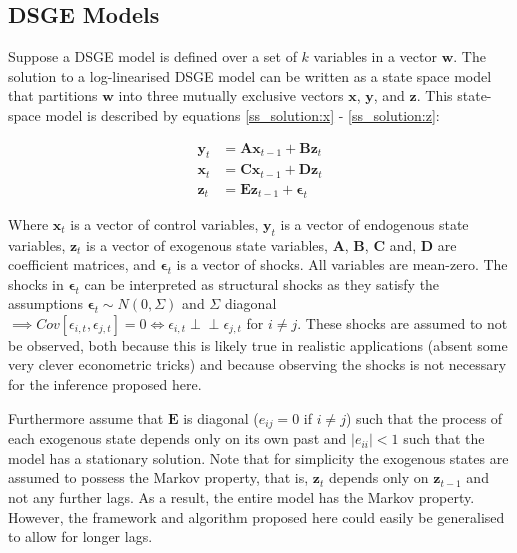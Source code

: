 \documentclass{article}
\def\indep{\perp \!\!\! \perp}
\begin{document}
\subsection{DSGE Models} \label{dsge}

Suppose a DSGE model is defined over a set of $k$ variables in a vector $\mathbf{w}$. The solution to a log-linearised DSGE model can be written as a state space model \parencite{king1988production} that partitions $\mathbf{w}$ into three mutually exclusive vectors $\mathbf{x}$, $\mathbf{y}$, and $\mathbf{z}$. This state-space model is described by equations \ref{ss_solution:x} - \ref{ss_solution:z}:

\begin{align}
  \mathbf{y}_t &= \mathbf{A} \mathbf{x}_{t-1} + \mathbf{B} \mathbf{z}_{t} \label{ss_solution:x}\\
  \mathbf{x}_t &= \mathbf{C} \mathbf{x}_{t-1} + \mathbf{D} \mathbf{z}_{t} \label{ss_solution:y}\\
  \mathbf{z}_t &= \mathbf{E} \mathbf{z}_{t-1} + \mathbf{\epsilon}_{t} \label{ss_solution:z}
\end{align}

Where $\mathbf{x}_t$ is a vector of control variables, $\mathbf{y}_t$ is a vector of endogenous state variables, $\mathbf{z}_t$ is a vector of exogenous state variables, $\mathbf{A}$, $\mathbf{B}$, $\mathbf{C}$ and, $\mathbf{D}$ are coefficient matrices, and $\mathbf{\epsilon}_t$ is a vector of shocks. All variables are mean-zero. The shocks in $\mathbf{\epsilon}_t$ can be interpreted as structural shocks as they satisfy the assumptions $\mathbf{\epsilon}_{t} \sim N(0,\Sigma)$ and $\Sigma$ diagonal $\implies Cov[\epsilon_{i,t},\epsilon_{j,t}] = 0 \iff \epsilon_{i,t} \indep \epsilon_{j,t} $ for $i \not = j$. These shocks are assumed to not be observed, both because this is likely true in realistic applications (absent some very clever econometric tricks) and because observing the shocks is not necessary for the inference proposed here.

Furthermore assume that $\mathbf{E}$ is diagonal ($e_{ij} = 0$ if $i \not = j$) such that the process of each exogenous state depends only on its own past and $|e_{ii}| < 1$ such that the model has a stationary solution. Note that for simplicity the exogenous states are assumed to possess the Markov property, that is, $\mathbf{z}_t$ depends only on $\mathbf{z}_{t-1}$ and not any further lags. As a result, the entire model has the Markov property. However, the framework and algorithm proposed here could easily be generalised to allow for longer lags.
\end{document}
